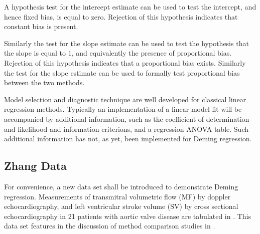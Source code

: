 \documentclass[12pt, a4paper]{report}
\theoremstyle{plain}
\theoremstyle{definition}
\theoremstyle{remark}
\begin{document}
A hypothesis test for the intercept estimate can be used to test the intercept, and hence fixed bias, is equal to zero. Rejection of this hypothesis indicates that constant bias is present. 

Similarly the test for the slope estimate can be used to test the hypothesis that the slope is equal to $1$, and equivalently the presence of proportional bias. Rejection of this hypothesis indicates that a proportional bias exists.
Similarly the test for the slope estimate can be used to formally test proportional bias between the two methods.



Model selection and diagnostic technique are well developed for classical linear regression methods. Typically an implementation of a linear model fit will be accompanied by additional information, such as the coefficient of determination and likelihood and information criterions, and a regression ANOVA table. Such additional information has not, as yet, been implemented for Deming regression.




\subsection{Zhang Data}
For convenience, a new data set shall be introduced to demonstrate
Deming regression. Measurements of transmitral volumetric flow
(MF) by doppler echocardiography, and left ventricular stroke
volume (SV) by cross sectional echocardiography in 21 patients
with aortic valve disease are tabulated in \citet{zhang}. This
data set features in the discussion of method comparison studies
in \citet[p.398]{AltmanBook} .
\end{document}
